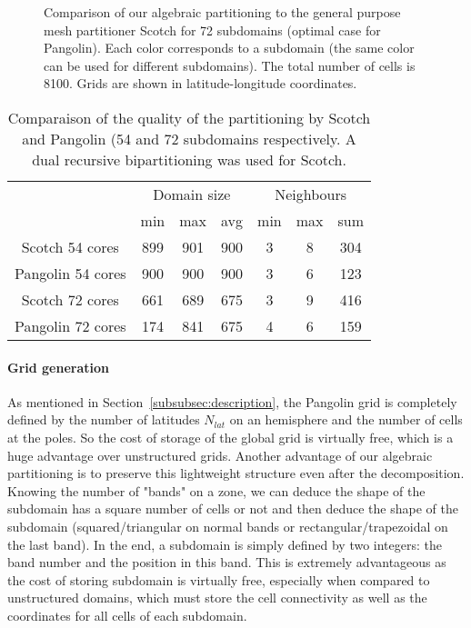 \begin{figure}
  \hfill
  \caption{
    Comparison of our algebraic partitioning
     to the general purpose mesh
    partitioner Scotch  for 72 subdomains
    (optimal case for Pangolin).  Each color corresponds to a subdomain (the
    same color can be used for different subdomains). The total number of
    cells is 8100. Grids are shown in latitude-longitude coordinates.
  }
  \label{fig:72_domains}
\end{figure}

\begin{table}
 \centering
  \begin{tabular}{*{7}{c}}
    \toprule
    & \multicolumn{3}{c}{Domain size} & \multicolumn{3}{c}{Neighbours} \\
     \cmidrule(r){2-7}
    & min & max & avg & min & max & sum \\
     \midrule
    Scotch 54 cores & 899 & 901 & 900 & 3   & 8   & 304\\
    Pangolin 54 cores & 900 & 900 & 900 & 3   & 6   & 123 \\
     \midrule
    Scotch  72 cores & 661 & 689 & 675 & 3   & 9   & 416\\
    Pangolin 72 cores & 174 & 841 & 675 & 4   & 6   & 159 \\
    \bottomrule
  \end{tabular}
  \caption{Comparaison of the quality of the partitioning by Scotch and Pangolin
  (54 and 72 subdomains respectively. A dual recursive
    bipartitioning was used for Scotch.}
  \label{tab:scotch_compare}
\end{table}

\paragraph{Grid generation}
As mentioned in Section~\ref{subsubsec:description}, the Pangolin grid is
completely defined by the number of latitudes $N_{lat}$ on an hemisphere and the
number of cells at the poles. So the cost of storage of the global grid is
virtually free, which is a huge advantage over unstructured grids.  Another
advantage of our algebraic partitioning is to preserve this lightweight
structure even after the decomposition. Knowing the number of "bands" on
a zone, we can deduce the shape of the subdomain has a square number of cells or
not and then deduce the shape of the subdomain (squared/triangular on normal
bands or rectangular/trapezoidal on the last band). In the end, a subdomain is
simply defined by two integers: the band number and the position in this band.
This is extremely advantageous as the cost of storing subdomain is virtually
free, especially when compared to unstructured domains, which must store the
cell connectivity as well as the coordinates for all cells of each subdomain. 

